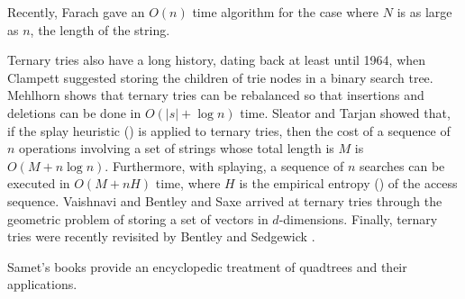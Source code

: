   Recently, Farach \cite{f97} gave
an $O(n)$ time algorithm for the case where $N$ is as large as $n$,
the length of the string.

Ternary tries also have a long history, dating back at least until
1964, when Clampett \cite{c64} suggested storing the children of trie
nodes in a binary search tree.  Mehlhorn \cite{m79} shows that ternary
tries can be rebalanced so that insertions and deletions can be done
in $O(|s|+\log n)$ time.  Sleator and Tarjan \cite{st85} showed that,
if the splay heuristic () is applied to ternary
tries, then the cost of a sequence of $n$ operations involving a set
of strings whose total length is $M$ is $O(M+n\log n)$.  Furthermore,
with splaying, a sequence of $n$ searches can be executed in $O(M+
nH)$ time, where $H$ is the empirical entropy () of
the access sequence.  Vaishnavi \cite{v84} and Bentley and Saxe
\cite{bs79} arrived at ternary tries through the geometric problem of
storing a set of vectors in $d$-dimensions.  Finally, ternary tries
were recently revisited by Bentley and Sedgewick \cite{bs97}.

Samet's books \cite{s90,sXX,sYY} provide an encyclopedic treatment of
quadtrees and their applications.


